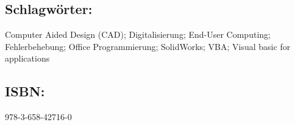 \subsection*{Schlagwörter:}
Computer Aided Design (CAD); Digitalisierung; End-User Computing; Fehlerbehebung; Office Programmierung; SolidWorks; VBA; Visual basic for applications
\subsection*{ISBN:}
978-3-658-42716-0